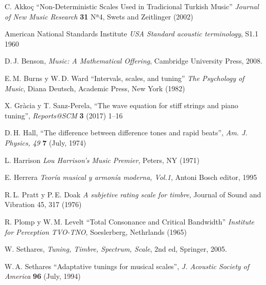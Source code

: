 \documentclass[11pt,a4paper]{article}
\begin{document}
\begin{thebibliography}{ABC9999}

C. Akkoç
``Non-Deterministic Scales Used in Tradicional Turkish Music''
    \textit{Journal of New Music Research} \textbf{31} Nª4, Swets and Zeitlinger (2002)

American National Standards Institute
	\textit{USA Standard acoustic terminology}, S1.1 1960

D.\,J. Benson,
\textit{Music: A Mathematical Offering}, 
Cambridge University Press, 2008.

E.\,M. Burns y W.\,D. Ward
``Intervals, scales, and tuning''
    \textit{The Psychology of Music}, Diana Deutsch, Academic Press, New York (1982)

X. Gràcia y T. Sanz-Perela,         %
``The wave equation for stiff strings and piano tuning'',
\textit{Reports@SCM} \textbf{3} (2017) 1--16

D.\,H. Hall,
``The difference between difference tones and rapid beats'',
	\textit{Am. J. Physics, 49} \textbf{7} (July, 1974)
	
L. Harrison
    \textit{Lou Harrison's Music Premier}, Peters, NY (1971)

E. Herrera %
	\textit{Teoría musical y armonía moderna, Vol.1}, Antoni Bosch editor, 1995
	
R.\,L. Pratt y P.\,E. Doak
	\textit{A subjetive rating scale for timbre}, Journal of Sound and Vibration 45, 317 (1976)

R. Plomp y W.\,M. Levelt
``Total Consonance and Critical Bandwidth''
    \textit{Institute for Perception TVO-TNO}, Soeslerberg, Nethrlands (1965)

W. Sethares,
\textit{Tuning, Timbre, Spectrum, Scale}, 2nd ed,
Springer, 2005.

W.\,A. Sethares
``Adaptative tunings for musical scales'',
\textit{J. Acoustic Society of America} \textbf{96} (July, 1994)

\end{thebibliography}
\end{document}
